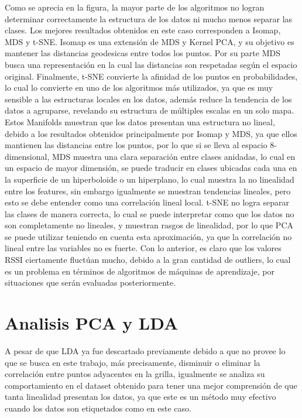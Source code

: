 Como se aprecia en la figura, la mayor parte de los algoritmos no logran determinar correctamente la estructura de los datos ni mucho menos separar las clases. Los mejores resultados obtenidos en este caso corresponden a Isomap, MDS y t-SNE. Isomap es una extensión de MDS y Kernel PCA, y su objetivo es mantener las distancias geodesicas entre todos los puntos. Por su parte MDS busca una representación en la cual las distancias son respetadas según el espacio original. Finalmente, t-SNE convierte la afinidad de los puntos en probabilidades, lo cual lo convierte en uno de los algoritmos más utilizados, ya que es muy sensible a las estructuras locales en los datos, además reduce la tendencia de los datos a agruparse, revelando su estructura de múltiples escalas en un solo mapa. Estos Manifolds muestran que los datos presentan una estructura no lineal, debido a los resultados obtenidos principalmente por Isomap y MDS, ya que ellos mantienen  las distancias entre los puntos, por lo que si se lleva al espacio 8-dimensional, MDS muestra una clara separación entre clases anidadas, lo cual en un espacio de mayor dimensión, se puede traducir en clases ubicadas cada una en la superficie de un hiperboloide o un hiperplano, lo cual muestra la no linealidad entre los features, sin embargo igualmente se muestran tendencias lineales, pero esto se debe entender como una correlación lineal local. t-SNE no logra separar las clases de manera correcta, lo cual se puede interpretar como que los datos no son completamente no lineales, y muestran rasgos de linealidad, por lo que PCA se puede utilizar teniendo en cuenta esta aproximación, ya que la correlación no lineal entre las variables no es fuerte. Con lo anterior, es claro que los valores RSSI ciertamente fluctúan mucho, debido a la gran cantidad de outliers, lo cual es un problema en términos de algoritmos de máquinas de aprendizaje, por situaciones que serán evaluadas posteriormente.


\section{Analisis PCA y LDA}

A pesar de que LDA ya fue descartado previamente debido a que no provee lo que se busca en este trabajo, más precisamente, disminuir o eliminar la correlación entre puntos adyacentes en la grilla, igualmente se analiza su comportamiento en el dataset obtenido para tener una mejor comprensión de que tanta linealidad presentan los datos, ya que este es un método muy efectivo cuando los datos son etiquetados como en este caso. 

